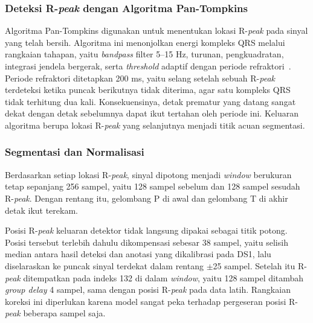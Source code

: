 \subsubsection{Deteksi R-\textit{peak} dengan Algoritma Pan-Tompkins}

Algoritma Pan-Tompkins digunakan untuk menentukan lokasi R-\textit{peak} pada sinyal yang telah bersih. Algoritma ini menonjolkan energi kompleks QRS melalui rangkaian tahapan, yaitu \textit{bandpass} filter 5--15 Hz, turunan, pengkuadratan, integrasi jendela bergerak, serta \textit{threshold} adaptif dengan periode refraktori~\cite{pan_tompkins_1985, li_2020}. Periode refraktori ditetapkan 200 ms, yaitu selang setelah sebuah R-\textit{peak} terdeteksi ketika puncak berikutnya tidak diterima, agar satu kompleks QRS tidak terhitung dua kali. Konsekuensinya, detak prematur yang datang sangat dekat dengan detak sebelumnya dapat ikut tertahan oleh periode ini. Keluaran algoritma berupa lokasi R-\textit{peak} yang selanjutnya menjadi titik acuan segmentasi.

\subsubsection{Segmentasi dan Normalisasi}

Berdasarkan setiap lokasi R-\textit{peak}, sinyal dipotong menjadi \textit{window} berukuran tetap sepanjang 256 sampel, yaitu 128 sampel sebelum dan 128 sampel sesudah R-\textit{peak}. Dengan rentang itu, gelombang P di awal dan gelombang T di akhir detak ikut terekam.

Posisi R-\textit{peak} keluaran detektor tidak langsung dipakai sebagai titik potong. Posisi tersebut terlebih dahulu dikompensasi sebesar 38 sampel, yaitu selisih median antara hasil deteksi dan anotasi yang dikalibrasi pada DS1, lalu diselaraskan ke puncak sinyal terdekat dalam rentang $\pm$25 sampel. Setelah itu R-\textit{peak} ditempatkan pada indeks 132 di dalam \textit{window}, yaitu 128 sampel ditambah \textit{group delay} 4 sampel, sama dengan posisi R-\textit{peak} pada data latih. Rangkaian koreksi ini diperlukan karena model sangat peka terhadap pergeseran posisi R-\textit{peak} beberapa sampel saja.

